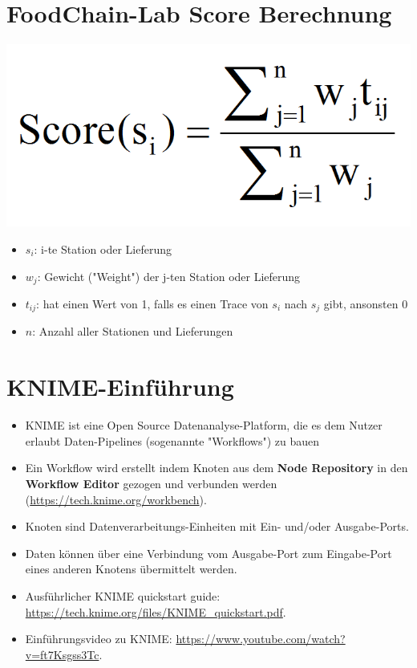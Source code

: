 \documentclass{beamer}
\begin{document}
\section{FoodChain-Lab Score Berechnung}
\begin{frame}
	\begin{center}
  		\includegraphics[height=0.3\textheight]{score.png}
	\end{center}
	\begin{itemize}
		\item $s_i$: i-te Station oder Lieferung
		\item $w_j$: Gewicht ("Weight") der j-ten Station oder Lieferung
		\item $t_{ij}$: hat einen Wert von 1, falls es einen Trace von $s_i$ nach $s_j$ gibt, ansonsten 0
		\item $n$: Anzahl aller Stationen und Lieferungen
	\end{itemize}
\end{frame}

\section{KNIME-Einführung}
\begin{frame}
	\begin{itemize}
		\item KNIME ist eine Open Source Datenanalyse-Platform, die es dem Nutzer erlaubt Daten-Pipelines (sogenannte "Workflows") zu bauen
		\item Ein Workflow wird erstellt indem Knoten aus dem \textbf{Node Repository} in den \textbf{Workflow Editor} gezogen und verbunden werden (\url{https://tech.knime.org/workbench}).
		\item Knoten sind Datenverarbeitungs-Einheiten mit Ein- und/oder Ausgabe-Ports.
		\item Daten können über eine Verbindung vom Ausgabe-Port zum Eingabe-Port eines anderen Knotens übermittelt werden.
		\item Ausführlicher KNIME quickstart guide: \url{https://tech.knime.org/files/KNIME_quickstart.pdf}.
		\item Einführungsvideo zu KNIME: \url{https://www.youtube.com/watch?v=ft7Ksgss3Tc}.
	\end{itemize}
\end{frame}
\end{document}
